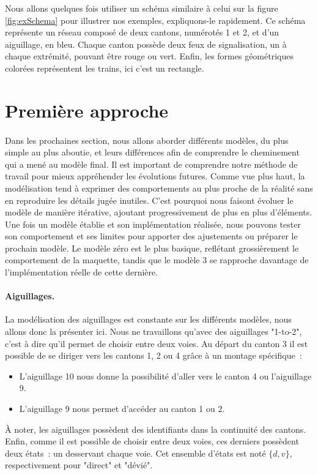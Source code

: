 \documentclass[oneside, a4paper, 11pt]{book}
\begin{document}
Nous allons quelques fois utiliser un schéma similaire à celui sur la figure \ref{fig:exSchema} pour illustrer nos exemples, expliquons-le rapidement.
Ce schéma représente un réseau composé de deux cantons, numérotés 1 et 2, et d'un aiguillage, en bleu. Chaque canton possède deux feux de signalisation, un à chaque extrémité, pouvant être rouge ou vert. Enfin, les formes géométriques colorées représentent les trains, ici c'est un rectangle.

\section{Première approche}

\paragraph{} 
Dans les prochaines section, nous allons aborder différents modèles, du plus simple au plus aboutie, et leurs différences afin de comprendre le cheminement qui a mené au modèle final. Il est important de comprendre notre méthode de travail pour mieux appréhender les évolutions futures.
Comme vue plus haut, la modélisation tend à exprimer des comportements au plus proche de la réalité sans en reproduire les détails jugée inutiles.
C'est pourquoi nous faisont évoluer le modèle de manière itérative, ajoutant progressivement de plus en plus d'éléments.
Une fois un modèle établie et son implémentation réalisée, nous pouvons tester son comportement et ses limites pour apporter des ajustements ou préparer le prochain modèle.
Le modèle zéro est le plus basique, reflétant grossièrement le comportement de la maquette, tandis que le modèle 3 se rapproche davantage de l'implémentation réelle de cette dernière.

\paragraph{Aiguillages.}
La modélisation des aiguillages est constante sur les différents modèles, nous allons donc la présenter ici. Nous ne travaillons qu'avec des aiguillages "1-to-2", c'est à dire qu'il permet de choisir entre deux voies.
Au départ du canton 3 il est possible de se diriger vers les cantons 1, 2 ou 4 grâce à un montage spécifique~: 
\begin{itemize}
	\item L'aiguillage 10 nous donne la possibilité d'aller vers le canton 4 ou l'aiguillage 9.
	\item L'aiguillage 9 nous permet d'accéder au canton 1 ou 2.
\end{itemize}
À noter, les aiguillages possèdent des identifiants dans la continuité des cantons.
Enfin, comme il est possible de choisir entre deux voies, ces derniers possèdent deux états~: un desservant chaque voie. Cet ensemble d'états est noté $\{d,v\}$, respectivement pour "direct" et "dévié". 
\end{document}
